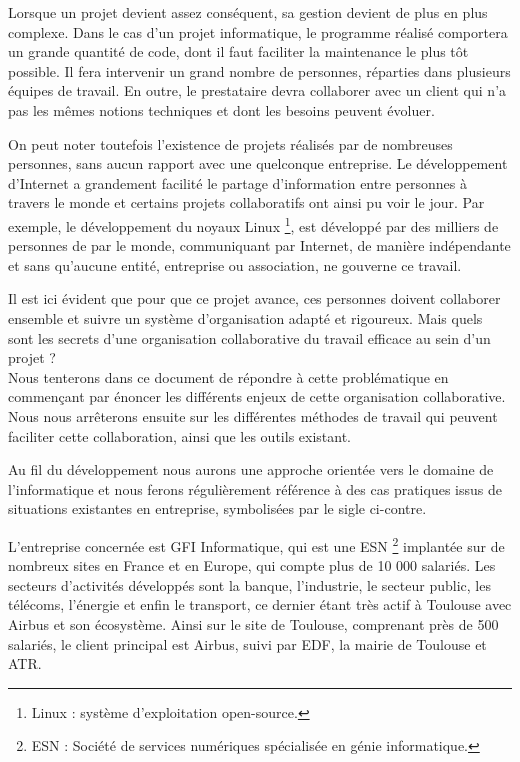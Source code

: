 
Lorsque un projet devient assez conséquent, sa gestion devient de plus en plus complexe. Dans le cas d'un projet informatique, le programme réalisé comportera un grande quantité de code, dont il faut faciliter la maintenance le plus tôt possible. Il fera intervenir un grand nombre de personnes, réparties dans plusieurs équipes de travail. En outre, le prestataire devra collaborer avec un client qui n'a pas les mêmes notions techniques et dont les besoins peuvent évoluer.

On peut noter toutefois l'existence de projets réalisés par de nombreuses personnes, sans aucun rapport avec une quelconque entreprise. Le développement d'Internet a grandement facilité le partage d'information entre personnes à travers le monde et certains projets collaboratifs ont ainsi pu voir le jour. Par exemple, le développement du noyaux Linux \footnote{Linux : système d'exploitation open-source.}, est développé par des milliers de personnes de par le monde, communiquant par Internet, de manière indépendante et sans qu'aucune entité, entreprise ou association, ne gouverne ce travail.

Il est ici évident que pour que ce projet avance, ces personnes doivent collaborer ensemble et suivre un système d'organisation adapté et rigoureux. Mais quels sont les secrets d'une organisation collaborative du travail efficace au sein d'un projet ?\\

Nous tenterons dans ce document de répondre à cette problématique en commençant par énoncer les différents enjeux de cette organisation collaborative. Nous nous arrêterons ensuite sur les différentes méthodes de travail qui peuvent faciliter cette collaboration, ainsi que les outils existant.

\begin{app}
Au fil du développement nous aurons une approche orientée vers le domaine de l'informatique et nous ferons régulièrement référence à des cas pratiques issus de situations existantes en entreprise, symbolisées par le sigle ci-contre.

L'entreprise concernée est GFI Informatique, qui est une \gls{ESN} \footnote{ESN : Société de services numériques spécialisée en génie informatique.} implantée sur de nombreux sites en France et en Europe, qui compte plus de 10 000 salariés. Les secteurs d'activités développés sont la banque, l'industrie, le secteur public, les télécoms, l'énergie et enfin le transport, ce dernier étant très actif à Toulouse avec Airbus et son écosystème. Ainsi sur le site de Toulouse, comprenant près de 500 salariés, le client principal est Airbus, suivi par EDF, la mairie de Toulouse et ATR.
\end{app}
